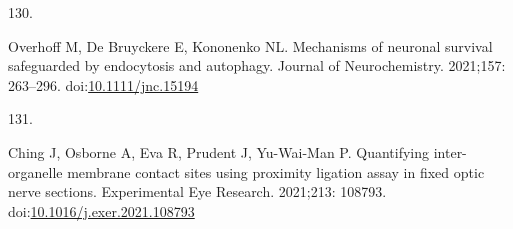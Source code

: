 \documentclass[
  12pt,
  a4paper,
]{book}
\newlength{\cslhangindent}
\newlength{\csllabelwidth}
\newlength{\cslentryspacingunit} %
\newenvironment{CSLReferences}[2] %
 {%
  \setlength{\parindent}{0pt}
  \ifodd #1
  \let\oldpar\par
  \def\par{\hangindent=\cslhangindent\oldpar}
  \fi
  \setlength{\parskip}{#2\cslentryspacingunit}
 }%
 {}
\newcommand{\CSLLeftMargin}[1]{\parbox[t]{\csllabelwidth}{#1}}
\newcommand{\CSLRightInline}[1]{\parbox[t]{\linewidth - \csllabelwidth}{#1}\break}
\begin{document}
\begin{CSLReferences}{0}{0}
\leavevmode{}%
\CSLLeftMargin{130. }%
\CSLRightInline{Overhoff M, De Bruyckere E, Kononenko NL. Mechanisms of neuronal survival safeguarded by endocytosis and autophagy. Journal of Neurochemistry. 2021;157: 263--296. doi:\href{https://doi.org/10.1111/jnc.15194}{10.1111/jnc.15194}}

\leavevmode{}%
\CSLLeftMargin{131. }%
\CSLRightInline{Ching J, Osborne A, Eva R, Prudent J, Yu-Wai-Man P. Quantifying inter-organelle membrane contact sites using proximity ligation assay in fixed optic nerve sections. Experimental Eye Research. 2021;213: 108793. doi:\href{https://doi.org/10.1016/j.exer.2021.108793}{10.1016/j.exer.2021.108793}}

\end{CSLReferences}
\end{document}
